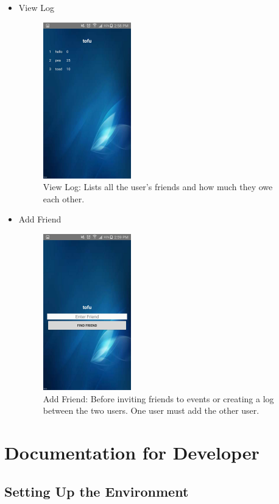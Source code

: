 \documentclass[12pt]{article}
\begin{document}
\begin{itemize}
\begin{figure}[H]
        \label{view_events}
    \end{figure} 
\item View Log
    \begin{figure}[H]
        \centering
        \includegraphics[width=1.5in]{view_log.jpg}
        \caption{View Log: Lists all the user's friends and how much they owe each other.}
        \label{view_log}
    \end{figure} 
\item Add Friend
    \begin{figure}[H]
        \centering
        \includegraphics[width=1.5in]{add_friend.jpg}
        \caption{Add Friend: Before inviting friends to events or creating a log between the two users. One
        user must add the other user.}
        \label{add_friend}
    \end{figure} 
\end{itemize}



\section{Documentation for Developer}

\subsection{Setting Up the Environment}
\end{document}
